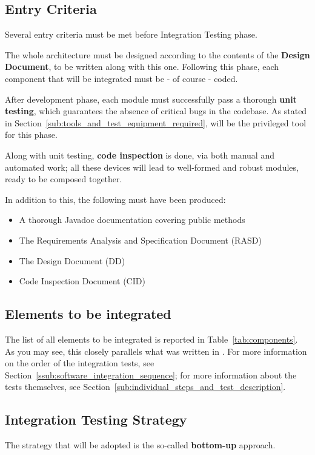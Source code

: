 \documentclass[a4paper, 12pt]{article}
\begin{document}
\subsection{Entry Criteria}
\label{sub:entry_criteria}
Several entry criteria must be met before Integration Testing phase.

The whole architecture must be designed according to the contents of the \textbf{Design Document}, to be written along with this one.
Following this phase, each component that will be integrated must be - of course - coded.

After development phase, each module must successfully pass a thorough \textbf{unit testing}, which guarantees the absence of critical bugs in the codebase. As stated in Section~\ref{sub:tools_and_test_equipment_required},  will be the privileged tool for this phase.

Along with unit testing, \textbf{code inspection} is done, via both manual and automated work; all these devices will lead to well-formed and robust modules, ready to be composed together.

In addition to this, the following must have been produced:
\begin{itemize}
    \item A thorough Javadoc documentation covering public methods
    \item The Requirements Analysis and Specification Document (RASD) \cite{bib:rasd}
    \item The Design Document (DD) \cite{bib:dd}
    \item Code Inspection Document (CID) \cite{bib:cid}
\end{itemize}

\subsection{Elements to be integrated}
\label{sub:elements_to_be_integrated}

The list of all elements to be integrated is reported in Table~\ref{tab:components}. As you may see, this closely parallels what was written in \cite{bib:dd}. For more information on the order of the integration tests, see Section~\ref{ssub:software_integration_sequence}; for more information about the tests themselves, see Section~\ref{sub:individual_steps_and_test_description}.



\subsection{Integration Testing Strategy}
\label{sub:integration_testing_strategy}
The strategy that will be adopted is the so-called \textbf{bottom-up} approach.
\end{document}
